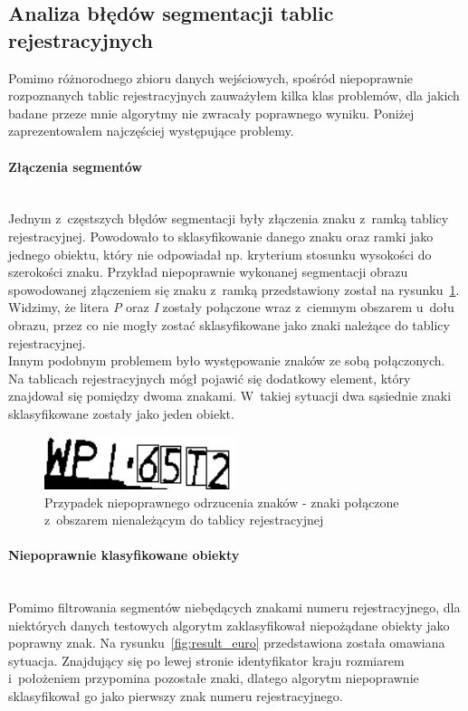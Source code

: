 \subsection{Analiza błędów segmentacji tablic rejestracyjnych}
Pomimo różnorodnego zbioru danych wejściowych, spośród niepoprawnie rozpoznanych tablic rejestracyjnych zauważyłem kilka klas problemów, dla jakich badane przeze mnie algorytmy nie zwracały poprawnego wyniku. Poniżej zaprezentowałem najczęściej występujące problemy.
\paragraph{Złączenia segmentów}\mbox{} \\
Jednym z~częstszych błędów segmentacji były złączenia znaku z~ramką tablicy rejestracyjnej. Powodowało to sklasyfikowanie danego znaku oraz ramki jako jednego obiektu, który nie odpowiadał np. kryterium stosunku wysokości do szerokości znaku. Przykład niepoprawnie wykonanej segmentacji obrazu spowodowanej złączeniem się znaku z~ramką przedstawiony został na rysunku~\ref{fig:polaczone_krawedzie}. Widzimy, że litera \textit{P} oraz \textit{I} zostały połączone wraz z~ciemnym obszarem u~dołu obrazu, przez co nie mogły zostać sklasyfikowane jako znaki należące do tablicy rejestracyjnej. \\
Innym podobnym problemem było występowanie znaków ze sobą połączonych. Na tablicach rejestracyjnych mógł pojawić się dodatkowy element, który znajdował się pomiędzy dwoma znakami. W~takiej sytuacji dwa sąsiednie znaki sklasyfikowane zostały jako jeden obiekt. 
\begin{figure}
  \centering
  \includegraphics[width=0.5\textwidth]{img/polaczone-krawedzie}
  \caption{Przypadek niepoprawnego odrzucenia znaków - znaki połączone z~obszarem nienależącym do tablicy rejestracyjnej}
  \label{fig:polaczone_krawedzie}
\end{figure}

\paragraph{Niepoprawnie klasyfikowane obiekty}\mbox{} \\
Pomimo filtrowania segmentów niebędących znakami numeru rejestracyjnego, dla niektórych danych testowych algorytm zaklasyfikował niepożądane obiekty jako poprawny znak. Na rysunku~\ref{fig:result_euro} przedstawiona została omawiana sytuacja. Znajdujący się po lewej stronie identyfikator kraju rozmiarem i~położeniem przypomina pozostałe znaki, dlatego algorytm niepoprawnie sklasyfikował go jako pierwszy znak numeru rejestracyjnego.

